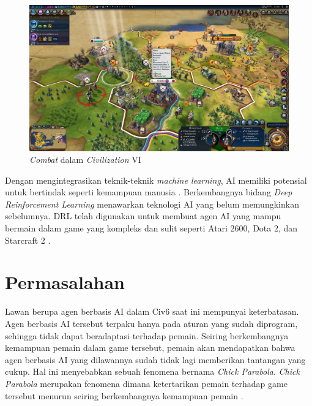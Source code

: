 \begin{figure}[H]
    \centering
      \includegraphics[scale=0.23]{gambar/civ6_screenshot.png}
      \caption{\emph{Combat} dalam \emph{Civilization} VI}
      \label{fig:civ6_combat_image}
  \end{figure}

Dengan mengintegrasikan teknik-teknik \emph{machine learning}, AI memiliki potensial untuk bertindak seperti kemampuan manusia \citep{humanLevelAI}.
Berkembangnya bidang \emph{Deep Reinforcement Learning} menawarkan teknologi AI yang belum memungkinkan sebelumnya. 
DRL telah digunakan untuk membuat agen AI yang mampu bermain dalam game yang kompleks dan sulit seperti Atari 2600, Dota 2, dan Starcraft 2 \citep{DRLSurvey}.

\section{Permasalahan}
\label{sec:permasalahan}

Lawan berupa agen berbasis AI dalam Civ6 saat ini mempunyai keterbatasan. 
Agen berbasis AI tersebut terpaku hanya pada aturan yang sudah diprogram, 
sehingga tidak dapat beradaptasi terhadap pemain. 
Seiring berkembangnya kemampuan pemain dalam game tersebut, 
pemain akan mendapatkan bahwa agen berbasis AI yang dilawannya sudah tidak lagi 
memberikan tantangan yang cukup. Hal ini menyebabkan sebuah fenomena bernama \emph{Chick Parabola}. 
\emph{Chick Parabola} merupakan fenomena dimana ketertarikan pemain terhadap game tersebut menurun seiring berkembangnya kemampuan pemain \citep{chickParabola}.

